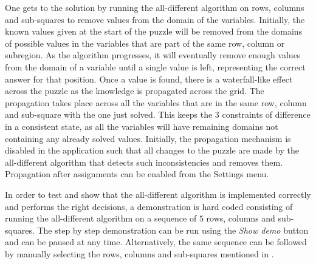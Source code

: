 \documentclass{l4proj}
\begin{document}
\noindent One gets to the solution by running the all-different algorithm on rows, columns and sub-squares to remove values from the domain of the variables. Initially, the known values given at the start of the puzzle will be removed from the domains of possible values in the variables that are part of the same row, column or subregion. As the algorithm progresses, it will eventually remove enough values from the domain of a variable until a single value is left, representing the correct answer for that position. Once a value is found, there is a waterfall-like effect across the puzzle as the knowledge is propagated across the grid. The propagation takes place across all the variables that are in the same row, column and sub-square with the one just solved. This keeps the 3 constraints of difference in a consistent state, as all the variables will have remaining domains not containing any already solved values. Initially, the propagation mechanism is disabled in the application such that all changes to the puzzle are made by the all-different algorithm that detects such inconsistencies and removes them. Propagation after assignments can be enabled from the Settings menu.

\noindent In order to test and show that the all-different algorithm is implemented correctly and performs the right decisions, a demonstration is hard coded consisting of running the all-different algorithm on a sequence of $5$ rows, columns and sub-squares. The step by step demonstration can be run using the \textit{Show demo} button and can be paused at any time. Alternatively, the same sequence can be followed by manually selecting the rows, columns and sub-squares mentioned in .
\end{document}

